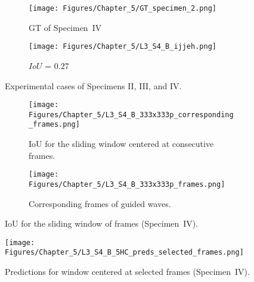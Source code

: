 \begin{figure} [!h]
	\begin{subfigure}[b]{0.47\textwidth}
		\centering
		\texttt{[image: Figures/Chapter\_5/GT\_specimen\_2.png]}
		\caption{GT of Specimen~IV}
		\label{fig:gt_specimen_4}
	\end{subfigure}
	\hfill
	\begin{subfigure}[b]{0.47\textwidth}
		\centering
		\texttt{[image: Figures/Chapter\_5/L3\_S4\_B\_ijjeh.png]}
		\caption{\(IoU\) = \(0.27\)} 
		\label{fig:L3_S4_B_ijjeh}
	\end{subfigure}
	\caption{Experimental cases of Specimens II, III, and IV.}
	\label{fig:exp_case}
\end{figure} 
\begin{figure} [!h]
	\centering
	\begin{subfigure}[b]{1\textwidth}
		\centering
		\texttt{[image: Figures/Chapter\_5/L3\_S4\_B\_333x333p\_corresponding\_frames.png]}
		\caption{IoU for the sliding window centered at consecutive frames.}
		\label{fig:L3_S4_B_333x333p_corresponding_frames}
	\end{subfigure}
	\par\medskip
	\begin{subfigure}[b]{1\textwidth}
		\centering
		\texttt{[image: Figures/Chapter\_5/L3\_S4\_B\_333x333p\_frames.png]}
		\caption{Corresponding frames of guided waves.} 
		\label{fig:L3_S4_B_333x333p_frames}
	\end{subfigure}
	\caption{IoU for the sliding window of frames (Specimen~IV).}
	\label{fig:L3_S4_B_333x333p_50kHz_5HC_IoU_centre_window}
\end{figure} 
\begin{figure}[!h]
	\centering
	\texttt{[image: Figures/Chapter\_5/L3\_S4\_B\_5HC\_preds\_selected\_frames.png]}
	\caption{Predictions for window centered at selected frames (Specimen~IV).}
	\label{fig:L3_S4_B_5HC_preds_selected_frames}
\end{figure}

